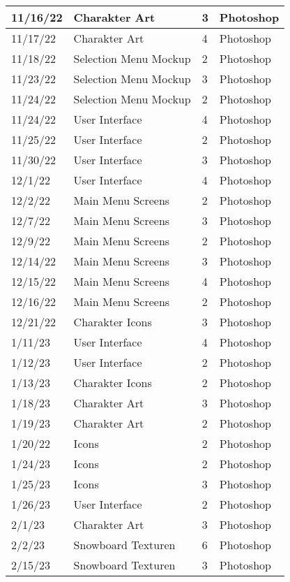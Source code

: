 \begin{longtable}{|p{1.5cm}|p{5.5cm}|p{1.2cm}|p{3.2cm}|}
	11/16/22 & Charakter Art & 3 & Photoshop \\ \hline
	11/17/22 & Charakter Art & 4 & Photoshop \\ \hline
	11/18/22 & Selection Menu Mockup & 2 & Photoshop \\ \hline
	11/23/22 & Selection Menu Mockup & 3 & Photoshop \\ \hline
	11/24/22 & Selection Menu Mockup & 2 & Photoshop \\ \hline
	11/24/22 & User Interface & 4 & Photoshop \\ \hline
	11/25/22 & User Interface & 2 & Photoshop \\ \hline
	11/30/22 & User Interface & 3 & Photoshop \\ \hline
	12/1/22 & User Interface & 4 & Photoshop \\ \hline
	12/2/22 & Main Menu Screens & 2 & Photoshop \\ \hline
	12/7/22 & Main Menu Screens & 3 & Photoshop \\ \hline
	12/9/22 & Main Menu Screens & 2 & Photoshop \\ \hline
	12/14/22 & Main Menu Screens & 3 & Photoshop \\ \hline
	12/15/22 & Main Menu Screens & 4 & Photoshop \\ \hline
	12/16/22 & Main Menu Screens & 2 & Photoshop \\ \hline
	12/21/22 & Charakter Icons & 3 & Photoshop \\ \hline
	1/11/23 & User Interface & 4 & Photoshop \\ \hline
	1/12/23 & User Interface & 2 & Photoshop \\ \hline
	1/13/23 & Charakter Icons & 2 & Photoshop \\ \hline
	1/18/23 & Charakter Art & 3 & Photoshop \\ \hline
	1/19/23 & Charakter Art & 2 & Photoshop \\ \hline
	1/20/22 & Icons & 2 & Photoshop \\ \hline
	1/24/23 & Icons & 2 & Photoshop \\ \hline
	1/25/23 & Icons & 3 & Photoshop \\ \hline
	1/26/23 & User Interface & 2 & Photoshop \\ \hline
	2/1/23 & Charakter Art & 3 & Photoshop \\ \hline
	2/2/23 & Snowboard Texturen & 6 & Photoshop \\ \hline
	2/15/23 & Snowboard Texturen & 3 & Photoshop \\ \hline

\end{longtable}
